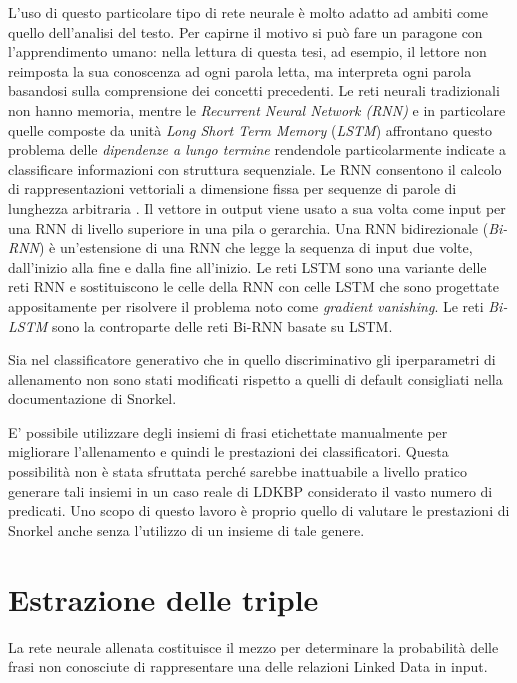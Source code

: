 L'uso di questo particolare tipo di rete neurale è molto adatto ad ambiti come quello dell'analisi del testo. Per capirne il motivo si può fare un paragone con l'apprendimento umano: nella lettura di questa tesi, ad esempio, il lettore non reimposta la sua conoscenza ad ogni parola letta, ma interpreta ogni parola basandosi sulla comprensione dei concetti precedenti. Le reti neurali tradizionali non hanno memoria, mentre le \textit{Recurrent Neural Network (RNN)} e in particolare quelle composte da unità \textit{Long Short Term Memory} (\textit{LSTM}) affrontano questo problema delle \textit{dipendenze a lungo termine} rendendole particolarmente indicate a classificare informazioni con struttura sequenziale. Le RNN consentono il calcolo di rappresentazioni vettoriali a dimensione fissa per sequenze di parole di lunghezza arbitraria \cite{DBLP:journals/corr/PlankSG16}. Il vettore in output viene usato a sua volta come input per una RNN di livello superiore in una pila o gerarchia. Una RNN bidirezionale (\textit{Bi-RNN}) è un'estensione di una RNN che legge la sequenza di input due volte, dall'inizio alla fine e dalla fine all'inizio.
Le reti LSTM sono una variante delle reti RNN e sostituiscono le celle della RNN con celle LSTM che sono progettate appositamente per risolvere il problema noto come \textit{gradient vanishing}. Le reti \textit{Bi-LSTM} sono la controparte delle reti Bi-RNN basate su LSTM.

Sia nel classificatore generativo che in quello discriminativo gli iperparametri di allenamento non sono stati modificati rispetto a quelli di default consigliati nella documentazione di Snorkel.

E' possibile utilizzare degli insiemi di frasi etichettate manualmente per migliorare l'allenamento e quindi le prestazioni dei classificatori. Questa possibilità non è stata sfruttata perché sarebbe inattuabile a livello pratico generare tali insiemi in un caso reale di LDKBP considerato il vasto numero di predicati. Uno scopo di questo lavoro è proprio quello di valutare le prestazioni di Snorkel anche senza l'utilizzo di un insieme di tale genere. 

\section{Estrazione delle triple}
\label{sec:methods:triples_extraction}
La rete neurale allenata costituisce il mezzo per determinare la probabilità delle frasi non conosciute di rappresentare una delle relazioni Linked Data in input. 

